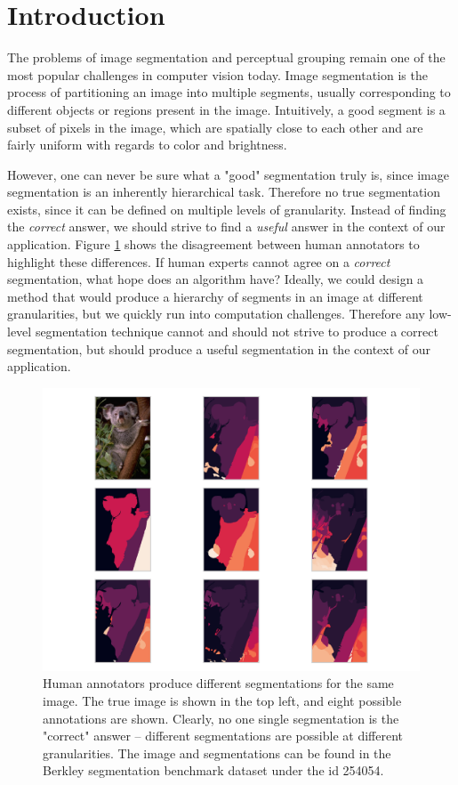 \documentclass[conference]{IEEEtran}
\begin{document}
\section{Introduction}
The problems of image segmentation and perceptual grouping remain one of the most popular challenges in computer vision today. Image segmentation is the process of partitioning an image into multiple segments, usually corresponding to different objects or regions present in the image. Intuitively, a good segment is a subset of pixels in the image, which are spatially close to each other and are fairly uniform with regards to color and brightness.

However, one can never be sure what a "good" segmentation truly is, since image segmentation is an inherently hierarchical task. Therefore no true segmentation exists, since it can be defined on multiple levels of granularity. Instead of finding the \textit{correct} answer, we should strive to find a \textit{useful} answer in the context of our application. Figure \ref{fig:house_segmentations} shows the disagreement between human annotators to highlight these differences. If human experts cannot agree on a \textit{correct} segmentation, what hope does an algorithm have? Ideally, we could design a method that would produce a hierarchy of segments in an image at different granularities, but we quickly run into computation challenges. Therefore any low-level segmentation technique cannot and should not strive to produce a correct segmentation, but should produce a useful segmentation in the context of our application.

\begin{figure}[ht]
    \centering
    \includegraphics[width=\linewidth]{images/house_segmentations.png}
    \caption{Human annotators produce different segmentations for the same image. The true image is shown in the top left, and eight possible annotations are shown. Clearly, no one single segmentation is the "correct" answer -- different segmentations are possible at different granularities. The image and segmentations can be found in the Berkley segmentation benchmark dataset under the id 254054.}
    \label{fig:house_segmentations}
\end{figure}
\end{document}

